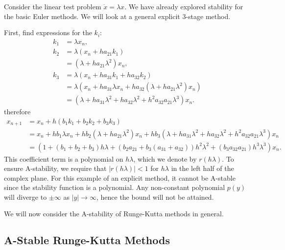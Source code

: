 Consider the linear test problem $\dot{x} = \lambda x$.
We have already explored stability for the basic Euler methods.
We will look at a general explicit 3-stage method.
\begin{example}
	First, find expressions for the $k_i$:
	\begin{align*}
		k_1 &= \lambda x_n, \\
		k_2 &= \lambda\left( x_n + h a_{21}k_1 \right) \\
		&= \left( \lambda + h a_{21}\lambda^2 \right)x_n, \\
		k_3 &= \lambda \left( x_n + h a_{31}k_1 + h a_{32}k_2 \right) \\
		&= \lambda \left( x_n + h a_{31} \lambda x_n + h a_{32}\left( \lambda + h a_{21} \lambda^2 \right) x_n \right) \\
		&= \left( \lambda + h a_{31}\lambda^2 + h a_{32}\lambda^2 + h^2 a_{32}a_{21}\lambda^3 \right) x_n.
	\end{align*}
	therefore
	\begin{align*}
		x_{n+1} &= x_n + h \left( b_1 k_1 + b_2 k_2 + b_3 k_3 \right) \\
		&= x_n + h b_1 \lambda x_n + h b_2 \left(\lambda + h a_{21} \lambda^2\right)x_n + hb_3 \left( \lambda + h a_{31} \lambda^2 + h a_{32} \lambda ^2 + h^2 a_{32} a_{21} \lambda^3\right)x_n \\
		&= \left(
			1 + \left( b_1 + b_2 + b_3 \right) h\lambda + \left(
				b_2 a_{21} + b_3 (a_{31} + a_{32})
			\right)h^2\lambda^2 + \left(
				b_3 a_{32} a_{21}
			\right)h^3\lambda^3
		\right)x_n.
	\end{align*}
	This coefficient term is a polynomial on $h\lambda$, which we denote by $r(h\lambda)$.
	To ensure A-stability, we require that $|r(h\lambda)| < 1$ for $h \lambda$ in the left half of the complex plane.
	For this example of an explicit method, it cannot be A-stable since the stability function is a polynomial.
	Any non-constant polynomial $p(y)$ will diverge to $\pm \infty$ as $|y| \rightarrow \infty$, hence the bound will not be attained.
\end{example}
We will now consider the A-stability of Runge-Kutta methods in general.

\subsection{A-Stable Runge-Kutta Methods}

